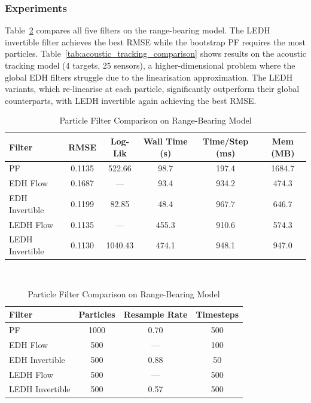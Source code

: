 \documentclass{article}
\begin{document}
\subsubsection{Experiments}
Table~\ref{tab:range_bearing_comparison} compares all five filters on the range-bearing model. The LEDH invertible filter achieves the best RMSE while the bootstrap PF requires the most particles. Table~\ref{tab:acoustic_tracking_comparison} shows results on the acoustic tracking model (4 targets, 25 sensors), a higher-dimensional problem where the global EDH filters struggle due to the linearisation approximation. The LEDH variants, which re-linearise at each particle, significantly outperform their global counterparts, with LEDH invertible again achieving the best RMSE.






\begin{table}[H]
\centering
\caption{Particle Filter Comparison on Range-Bearing Model}
\begin{tabular}{lccccc}
\toprule
\textbf{Filter} & \textbf{RMSE} & \textbf{Log-Lik} & \textbf{Wall Time (s)} & \textbf{Time/Step (ms)} & \textbf{Mem (MB)} \\
\midrule
PF                & 0.1135 & 522.66  & 98.7   & 197.4   & 1684.7 \\
EDH Flow          & 0.1687 & ---     & 93.4   & 934.2   & 474.3  \\
EDH Invertible    & 0.1199 & 82.85   & 48.4   & 967.7   & 646.7  \\
LEDH Flow         & 0.1135 & ---     & 455.3  & 910.6   & 574.3  \\
LEDH Invertible   & 0.1130 & 1040.43 & 474.1  & 948.1   & 947.0  \\
\bottomrule
\end{tabular}
\\[1em]
\begin{tabular}{lccc}
\toprule
\textbf{Filter} & \textbf{Particles} & \textbf{Resample Rate} & \textbf{Timesteps} \\
\midrule
PF                & 1000 & 0.70 & 500 \\
EDH Flow          & 500  & ---  & 100 \\
EDH Invertible    & 500  & 0.88 & 50  \\
LEDH Flow         & 500  & ---  & 500 \\
LEDH Invertible   & 500  & 0.57 & 500 \\
\bottomrule
\end{tabular}
\label{tab:range_bearing_comparison}
\end{table}
\end{document}
